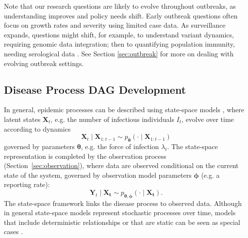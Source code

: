 \documentclass{article}
\begin{document}
Note that our research questions are likely to evolve throughout outbreaks, as understanding improves and policy needs shift. Early outbreak questions often focus on growth rates and severity using limited case data. As surveillance expands, questions might shift, for example, to understand variant dynamics, requiring genomic data integration; then to quantifying population immunity, needing serological data \citep{bhatia2023lessons,shearer2024opportunities}. See Section \ref{sec:outbreak} for more on dealing with evolving outbreak settings.

\subsection{Disease Process DAG Development} \label{sec:process}

In general, epidemic processes can be described using state-space models \citep{birrell2018evidence}, where latent states $\boldsymbol{X}_t$, e.g. the number of infectious individuals $I_t$, evolve over time according to dynamics 
$$
\boldsymbol{X}_{t} \mid \boldsymbol{X}_{1:t-1} \sim p_{\boldsymbol{\theta}}(\cdot \mid \boldsymbol{X}_{1:t-1})
$$
governed by parameters $\boldsymbol{\theta}$, e.g. the force of infection $\lambda_t$. The state-space representation is completed by the observation process (Section~\ref{sec:observation}), where data are observed conditional on the current state of the system, governed by observation model parameters $\boldsymbol{\phi}$ (e.g. a reporting rate):
$$
\boldsymbol{Y}_{t} \mid \boldsymbol{X_t} \sim p_{\boldsymbol{\theta},\boldsymbol{\phi}}(\cdot \mid \boldsymbol{X_t}). 
$$
The state-space framework links the disease process to observed data. Although in general state-space models represent stochastic processes over time, models that include deterministic relationships or that are static can be seen as special cases \citep{birrell2018evidence}. 
\end{document}
